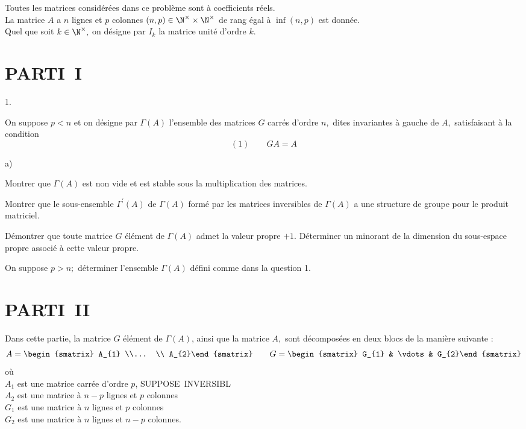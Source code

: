 \documentclass[11pt]{article}%
\begin{document}
\noindent Toutes les matrices considérées dans ce problème sont à
coefficients réels.\\
La matrice $A$ a $n$ lignes et $p$ colonnes $(n,p)\in \N^{\times
}\times \N^{\times }$ de rang égal à $\inf (n,p)$ est donnée.\\
Quel que soit $k\in \N^{\times },$ on désigne par $I_{k}$ la matrice
unité d'ordre $k.$

\section*{PARTI\E\ I}

\begin{noliste}{1.}
 \setlength{\itemsep}{4mm}
\item On suppose $p<n$ et on désigne par $\Gamma (A)$ l'ensemble des
matrices $G$ carrés d'ordre $n,$ dites invariantes à gauche de $A,$
satisfaisant à la condition 
\[
(1)\qquad GA = A
\]

\begin{noliste}{a)}
 \setlength{\itemsep}{2mm}
\item Montrer que $\Gamma (A)$ est non vide et est stable sous la
multiplication des matrices.

\item Montrer que le sous-ensemble $\Gamma ^{\prime }(A)$ de $\Gamma
(A)$
formé par les matrices inversibles de $\Gamma (A)$ a une structure de
groupe
pour le produit matriciel.

\item Démontrer que toute matrice $G$ élément de $\Gamma (A)$ admet la
valeur propre $ + 1.$ Déterminer un minorant de la dimension du
sous-espace
propre associé à cette valeur propre.
\end{noliste}

\item On suppose $p>n;$ déterminer l'ensemble $\Gamma (A)$ défini comme
dans
la question 1.
\end{noliste}

\section*{PARTI\E\ II}

Dans cette partie, la matrice $G$ élément de $\Gamma (A)$, ainsi que la
matrice $A,$ sont décomposées en deux blocs de la manière suivante :
\[
A = 
\begin{smatrix}
A_{1} \\... \\
A_{2}\end{smatrix}
\qquad G = 
\begin{smatrix}
G_{1} & \vdots & G_{2}\end{smatrix}
\]
où \\
$A_{1}$ est une matrice carrée d'ordre $p$, SUPPOSE\E\ INVERSIBL\E\\
$A_{2}$ est une matrice à $n-p$ lignes et $p$ colonnes\\
$G_{1}$ est une matrice à $n$ lignes et $p$ colonnes\\
$G_{2}$ est une matrice à $n$ lignes et $n-p$ colonnes.
\end{document}
